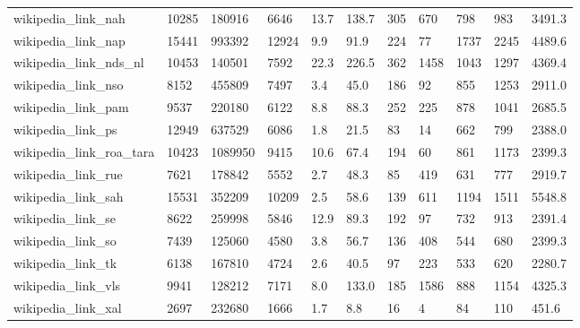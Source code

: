 \begin{longtable}{lllllllllll}
 wikipedia\_link\_nah                                 & 10285      & 180916    & 6646  & 13.7   & 138.7  & 305   & 670    & 798    & 983    & 3491.3  \\
 wikipedia\_link\_nap                                 & 15441      & 993392    & 12924 & 9.9    & 91.9   & 224   & 77     & 1737   & 2245   & 4489.6  \\
 wikipedia\_link\_nds\_nl                              & 10453      & 140501    & 7592  & 22.3   & 226.5  & 362   & 1458   & 1043   & 1297   & 4369.4  \\
 wikipedia\_link\_nso                                 & 8152       & 455809    & 7497  & 3.4    & 45.0   & 186   & 92     & 855    & 1253   & 2911.0  \\
 wikipedia\_link\_pam                                 & 9537       & 220180    & 6122  & 8.8    & 88.3   & 252   & 225    & 878    & 1041   & 2685.5  \\
 wikipedia\_link\_ps                                  & 12949      & 637529    & 6086  & 1.8    & 21.5   & 83    & 14     & 662    & 799    & 2388.0  \\
 wikipedia\_link\_roa\_tara                            & 10423      & 1089950   & 9415  & 10.6   & 67.4   & 194   & 60     & 861    & 1173   & 2399.3  \\
 wikipedia\_link\_rue                                 & 7621       & 178842    & 5552  & 2.7    & 48.3   & 85    & 419    & 631    & 777    & 2919.7  \\
 wikipedia\_link\_sah                                 & 15531      & 352209    & 10209 & 2.5    & 58.6   & 139   & 611    & 1194   & 1511   & 5548.8  \\
 wikipedia\_link\_se                                  & 8622       & 259998    & 5846  & 12.9   & 89.3   & 192   & 97     & 732    & 913    & 2391.4  \\
 wikipedia\_link\_so                                  & 7439       & 125060    & 4580  & 3.8    & 56.7   & 136   & 408    & 544    & 680    & 2399.3  \\
 wikipedia\_link\_tk                                  & 6138       & 167810    & 4724  & 2.6    & 40.5   & 97    & 223    & 533    & 620    & 2280.7  \\
 wikipedia\_link\_vls                                 & 9941       & 128212    & 7171  & 8.0    & 133.0  & 185   & 1586   & 888    & 1154   & 4325.3  \\
 wikipedia\_link\_xal                                 & 2697       & 232680    & 1666  & 1.7    & 8.8    & 16    & 4      & 84     & 110    & 451.6   \\

\end{longtable}
